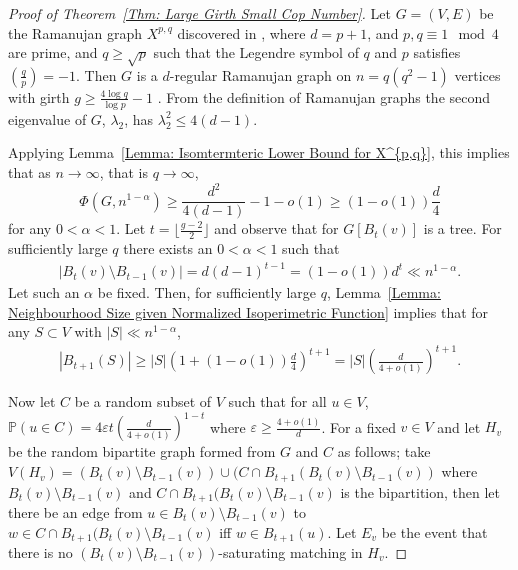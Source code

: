 \documentclass{amsart}
\theoremstyle{definition}
\def\epsilon{\varepsilon}
\begin{document}
\begin{proof}[Proof of Theorem~\ref{Thm: Large Girth Small Cop Number}]
Let $G = (V,E)$ be the Ramanujan graph $X^{p,q}$ discovered in \cite{lubotzky1988ramanujan}, where $d = p+1$, and $p,q \equiv 1 \mod{4}$ are prime, and $q \geq \sqrt{p}$ such that the Legendre symbol of $q$ and $p$ satisfies $(\frac{q}{p}) = -1$. Then $G$ is a $d$-regular Ramanujan graph on $n = q(q^2-1)$ vertices with girth $g \geq \frac{4 \log{q}}{\log{p}} -1$ \cite{lubotzky1988ramanujan}. From the definition of Ramanujan graphs the second eigenvalue of $G$, $\lambda_2$, has $\lambda_2^2 \leq 4(d-1)$.

Applying Lemma~\ref{Lemma: Isomtermteric Lower Bound for X^{p,q}}, this implies that as $n \rightarrow \infty$, that is $q \rightarrow \infty$, 
\[
\Phi (G,n^{1-\alpha})  \geq \frac{d^2}{4(d-1)} - 1 - o(1) \geq (1-o(1))\frac{d}{4}
\]
for any $0 < \alpha < 1$. Let $t = \lfloor \frac{g-2}{2} \rfloor$ and observe that for $G[B_t(v)]$ is a tree. For sufficiently large $q$ there exists an $0< \alpha < 1$ such that
\begin{align*} 
|B_t(v) \setminus B_{t-1}(v)| = d(d-1)^{t-1} = (1-o(1))d^t \ll  n^{1-\alpha}.
\end{align*}
Let such an $\alpha$ be fixed. Then, for sufficiently large $q$, Lemma~\ref{Lemma: Neighbourhood Size given Normalized Isoperimetric Function} implies that for any $S \subset V$ with $|S| \ll n^{1-\alpha}$, 
\begin{align*} 
|B_{t+1}(S)| \geq |S|(1+(1-o(1))\frac{d}{4})^{t+1} = |S|(\frac{d}{4+o(1)})^{t+1}.
\end{align*}


Now let $C$ be a random subset of $V$ such that for all $u \in V$, $\mathbb{P}(u \in C) = 4\epsilon t (\frac{d}{4+o(1)})^{1-t}$ where $\epsilon \geq \frac{4+o(1)}{d}$. For a fixed $v \in V$ and let $H_v$ be the random bipartite graph formed from $G$ and $C$ as follows; take $V(H_v) = (B_t(v) \setminus B_{t-1}(v)) \cup (C \cap B_{t+1}(B_t(v) \setminus B_{t-1}(v))$ where $B_t(v) \setminus B_{t-1}(v)$ and $C \cap B_{t+1}(B_t(v) \setminus B_{t-1}(v)$  is the bipartition, then let there be an edge from $u \in B_t(v) \setminus B_{t-1}(v)$ to $w\in C \cap B_{t+1}(B_t(v) \setminus B_{t-1}(v)$ iff $w \in B_{t+1}(u)$. Let $E_v$ be the event that there is no $(B_t(v) \setminus B_{t-1}(v))$-saturating matching in $H_v$.


\end{proof}
\end{document}
